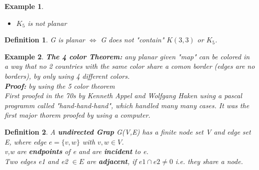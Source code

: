 \documentclass[10pt,a4paper]{article}
\newtheorem {defi}{Definition}[section]
\newtheorem{eg}{Example}[section]
\begin{document}
\begin{eg}
\begin{itemize}
\begin{figure}[h!]
		\caption{Solution for $K_{4}$}
	\end{figure}
	
	\item $K_{5} $ is not planar
	\end{itemize}
\end{eg}
\newpage
\begin{defi}
	G is planar $\Leftrightarrow$ G does not "contain" $K(3,3)$ or $K_{5}$. 
\end{defi}
\begin{eg}
	\textbf{The 4 color Theorem: } any planar given "map" can be colored in a way that no 2 countries with the same color share a comon border (edges are no borders), by only using 4 different colors. \\
	\textbf{Proof: } by using the 5 color theorem\\
	First proofed in the 70s by Kenneth Appel and Wolfgang Haken using a pascal programm called "hand-hand-hand", which handled many many cases. It was the first major thorem proofed by using a computer.  
\end{eg}
\begin{defi}
	A \textbf{undirected Grap} G(V,E) has a finite node set V and edge set E, where edge $e =  \{v,w\}$ with $v, w \in V$. \\
	v,w are \textbf{endpoints} of e and are \textbf{incident} to e. \\
	Two edges e1 and e2 $\in E$ are \textbf{adjacent}, if $e1 \cap e2 \neq 0$ i.e. they share a node. 
\end{defi}
\end{document}
